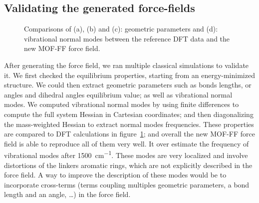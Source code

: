\documentclass[thesis]{subfiles}
\begin{document}
\subsection{Validating the generated force-fields}

\begin{figure}[t]
    \centering
    
    \caption{Comparisons of (a), (b) and (c): geometric parameters and (d):
    vibrational normal modes between the reference DFT data and the new MOF-FF
    force field.}
    \label{fig:fig:mof-ff:validation}
\end{figure}

After generating the force field, we ran multiple classical simulations to
validate it. We first checked the equilibrium properties, starting from an
energy-minimized structure. We could then extract geometric parameters such as
bonds lengths, or angles and dihedral angles equilibrium value; as well as
vibrational normal modes. We computed vibrational normal modes by using finite
differences to compute the full system Hessian in Cartesian coordinates; and
then diagonalizing the mass-weighted Hessian to extract normal modes
frequencies. These properties are compared to DFT calculations in
figure~\ref{fig:fig:mof-ff:validation}; and overall the new MOF-FF force field
is able to reproduce all of them very well. It over estimate the frequency of
vibrational modes after \SI{1500}{cm^{-1}}. These modes are very localized and
involve distortions of the linkers aromatic rings, which are not explicitly
described in the force field. A way to improve the description of these modes
would be to incorporate cross-terms (terms coupling multiples geometric
parameters, \ie a bond length and an angle, \dots) in the force field.
\end{document}
